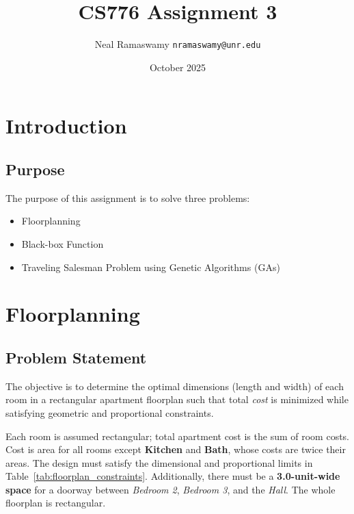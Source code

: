\documentclass{article}
\title{CS776 Assignment 3}
\author{Neal Ramaswamy \quad \texttt{nramaswamy@unr.edu}}
\date{October 2025}
\begin{document}
\maketitle

\section{Introduction}

\subsection{Purpose}
The purpose of this assignment is to solve three problems:
\begin{itemize}
    \item Floorplanning
    \item Black-box Function
    \item Traveling Salesman Problem using Genetic Algorithms (GAs)
\end{itemize}

\section{Floorplanning}
\subsection{Problem Statement}
The objective is to determine the optimal dimensions (length and width) of each room in a rectangular apartment floorplan such that total \emph{cost} is minimized while satisfying geometric and proportional constraints.

Each room is assumed rectangular; total apartment cost is the sum of room costs. Cost is area for all rooms except \textbf{Kitchen} and \textbf{Bath}, whose costs are twice their areas. The design must satisfy the dimensional and proportional limits in Table~\ref{tab:floorplan_constraints}. Additionally, there must be a \textbf{3.0-unit-wide space} for a doorway between \textit{Bedroom 2}, \textit{Bedroom 3}, and the \textit{Hall}. The whole floorplan is rectangular.
\end{document}
